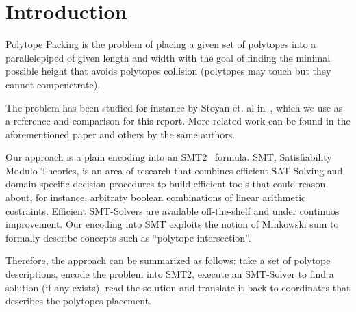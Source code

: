 \section{Introduction}
Polytope Packing is the problem of placing a given set of
polytopes into a parallelepiped of given length and width
with the goal of finding the minimal possible height that
avoids polytopes collision (polytopes may touch but they
cannot compenetrate). 

The problem has been studied for instance by 
Stoyan et. al in~\cite{sto03}, which we use as
a reference and comparison for this report. More related
work can be found in the aforementioned paper and others
by the same authors.

Our approach is a plain encoding into an SMT2~\cite{SMTLIB} 
formula. SMT, Satisfiability Modulo Theories, is an area of 
research that combines efficient SAT-Solving and domain-specific
decision procedures to build efficient tools that could
reason about, for instance, arbitraty boolean combinations 
of linear arithmetic costraints. Efficient SMT-Solvers are
available off-the-shelf and under continuos improvement. 
Our encoding into SMT exploits the notion of Minkowski sum 
to formally describe concepts such as ``polytope intersection''.

Therefore, the approach can be summarized as follows: 
take a set of polytope descriptions, encode the problem
into SMT2, execute an SMT-Solver to find a solution (if any
exists), read the solution and translate it back to
coordinates that describes the polytopes placement.

